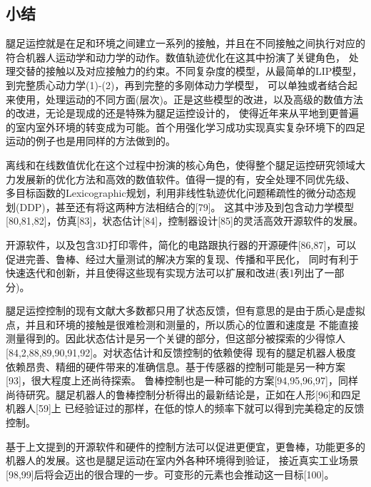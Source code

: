 \subsection{小结}
腿足运控就是在足和环境之间建立一系列的接触，并且在不同接触之间执行对应的符合机器人运动学和动力学的动作。数值轨迹优化在这其中扮演了关键角色，
处理交替的接触以及对应接触力的约束。不同复杂度的模型，从最简单的LIP模型，到完整质心动力学(1)-(2)，再到完整的多刚体动力学模型，
可以单独或者结合起来使用，处理运动的不同方面(层次)。正是这些模型的改进，以及高级的数值方法的改进，无论是现成的还是特殊为腿足运控设计的，
使得近年来从平地到更普遍的室内室外环境的转变成为可能。首个用强化学习成功实现真实复杂环境下的四足运动的例子也是用同样的方法做到的。

离线和在线数值优化在这个过程中扮演的核心角色，使得整个腿足运控研究领域大力发展新的优化方法和高效的数值软件。值得一提的有，安全处理不同优先级、
多目标函数的Lexicographic规划，利用非线性轨迹优化问题稀疏性的微分动态规划(DDP)，甚至还有将这两种方法相结合的[79]。
这其中涉及到包含动力学模型[80,81,82]，仿真[83]，状态估计[84]，控制器设计[85]的灵活高效开源软件的发展。

开源软件，以及包含3D打印零件，简化的电路跟执行器的开源硬件[86,87]，可以促进完善、鲁棒、经过大量测试的解决方案的复现、传播和平民化，
同时有利于快速迭代和创新，并且使得这些现有实现方法可以扩展和改进(表1列出了一部分)。

腿足运控控制的现有文献大多数都只用了状态反馈，但有意思的是由于质心是虚拟点，并且和环境的接触是很难检测和测量的，所以质心的位置和速度是
不能直接测量得到的。因此状态估计是另一个关键的部分，但这部分被探索的少得惊人[84,2,88,89,90,91,92]。对状态估计和反馈控制的依赖使得
现有的腿足机器人极度依赖昂贵、精细的硬件带来的准确信息。基于传感器的控制可能是另一种方案[93]，很大程度上还尚待探索。
鲁棒控制也是一种可能的方案[94,95,96,97]，同样尚待研究。腿足机器人的鲁棒控制分析得出的最新结论是，正如在人形[96]和四足机器人[59]上
已经验证过的那样，在低的惊人的频率下就可以得到完美稳定的反馈控制。

基于上文提到的开源软件和硬件的控制方法可以促进更便宜，更鲁棒，功能更多的机器人的发展。这也是腿足运动在室内外各种环境得到验证，
接近真实工业场景[98,99]后将会迈出的很合理的一步。可变形的元素也会推动这一目标[100]。
